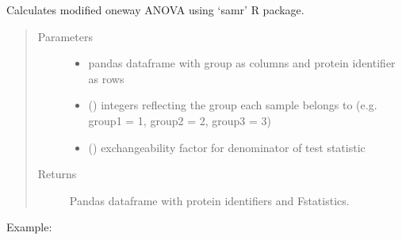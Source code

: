 \documentclass[letterpaper,10pt,english]{sphinxmanual}
\begin{document}
\begin{fulllineitems}
\label{\detokenize{_autosummary/analytics_core.analytics:analytics_core.analytics.analytics.calculate_anova_samr}}
Calculates modified one\sphinxhyphen{}way ANOVA using ‘samr’ R package.
\begin{quote}\begin{description}
\item[{Parameters}] \leavevmode\begin{itemize}
\item {} 
 \textendash{} pandas dataframe with group as columns and protein identifier as rows

\item {} 
 () \textendash{} integers reflecting the group each sample belongs to (e.g. group1 = 1, group2 = 2, group3 = 3)

\item {} 
 () \textendash{} exchangeability factor for denominator of test statistic

\end{itemize}

\item[{Returns}] \leavevmode
Pandas dataframe with protein identifiers and F\sphinxhyphen{}statistics.

\end{description}\end{quote}

Example:

\begin{sphinxVerbatim}[commandchars=\\\{\}]
    
\end{sphinxVerbatim}

\end{fulllineitems}

\end{document}
